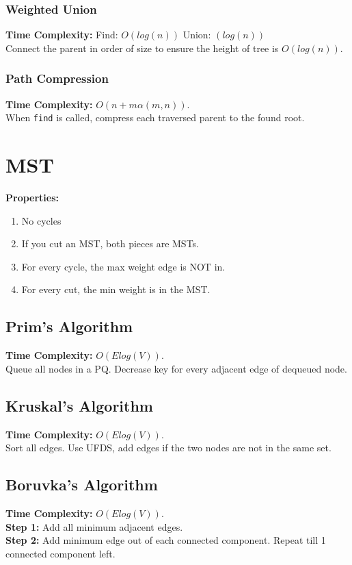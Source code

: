 \documentclass[10pt,landscape,a4paper]{article}
\begin{document}
\begin{multicols*}{4}
\subsubsection{Weighted Union}
\textbf{Time Complexity:} Find: $O(log(n))$ Union: $(log(n))$ \\
Connect the parent in order of size to ensure the height of tree is $O(log(n))$.

\subsubsection{Path Compression}
\textbf{Time Complexity:} $O(n + m\alpha(m, n))$. \\
When \texttt{find} is called, compress each traversed parent to the found root.

\section{MST}
\textbf{Properties:}
\begin{enumerate}
    \item No cycles
    \item If you cut an MST, both pieces are MSTs.
    \item For every cycle, the max weight edge is NOT in.
    \item For every cut, the min weight is in the MST.
\end{enumerate}

\subsection{Prim's Algorithm}
\textbf{Time Complexity:} $O(E log(V))$. \\
Queue all nodes in a PQ. Decrease key for every adjacent edge of dequeued node.

\subsection{Kruskal's Algorithm}
\textbf{Time Complexity:} $O(E log(V))$. \\
Sort all edges. Use UFDS, add edges if the two nodes are not in the same set.

\subsection{Boruvka's Algorithm}
\textbf{Time Complexity:} $O(E log(V))$. \\
\textbf{Step 1:} Add all minimum adjacent edges. \\
\textbf{Step 2:} Add minimum edge out of each connected component. Repeat till 1 connected component left.


\end{multicols*}
\end{document}

